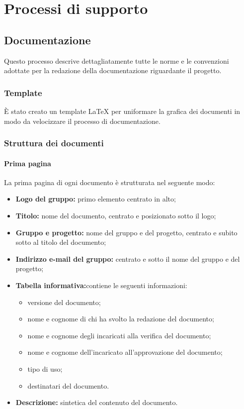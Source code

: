 \documentclass[NormediProgetto.tex]{subfiles}
\begin{document}
\chapter{Processi di supporto}

\section{Documentazione}

Questo processo descrive dettagliatamente tutte le norme e le convenzioni adottate per la redazione della documentazione riguardante il progetto.

\subsection{Template}

È stato creato un template \LaTeX{} per uniformare la grafica dei documenti in modo da velocizzare il processo di documentazione.

\subsection{Struttura dei documenti}

\subsubsection{Prima pagina}

La prima pagina di ogni documento è strutturata nel seguente modo:

\begin{itemize}
    \item{\textbf{Logo del gruppo:}} primo elemento centrato in alto; 
    \item{\textbf{Titolo:}} nome del documento, centrato e posizionato sotto il logo; 
    \item{\textbf{Gruppo e progetto:}} nome del gruppo e del progetto, centrato e subito sotto al titolo del documento; 
    \item{\textbf{Indirizzo e-mail del gruppo:}} centrato e sotto il nome del gruppo e del progetto; 
    \item{\textbf{Tabella informativa:}}contiene le seguenti informazioni: 
    \begin{itemize} 
        \item versione del documento;
        \item nome e cognome di chi ha svolto la redazione del documento; 
        \item nome e cognome degli incaricati alla verifica del documento; 
        \item nome e cognome dell'incaricato all’approvazione del documento;
        \item tipo di uso; 
        \item  destinatari del documento.
        \end{itemize}
    \item {\textbf{Descrizione:}} sintetica del contenuto del documento.
\end{itemize}
\end{document}
